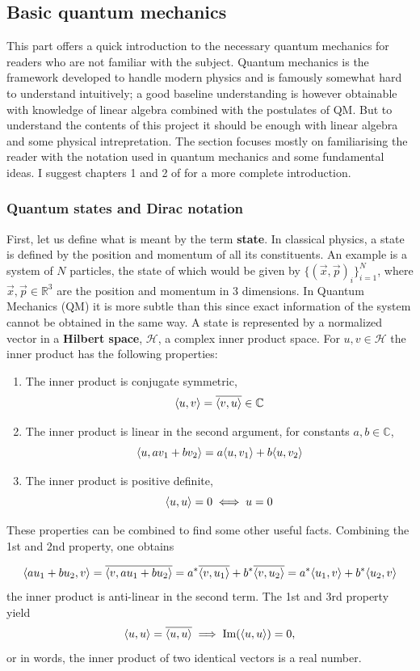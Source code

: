 
\subsection{Basic quantum mechanics}
This part offers a quick introduction to the necessary quantum mechanics for readers who are not familiar with the subject. Quantum mechanics is the framework developed to handle modern physics and is famously somewhat hard to understand intuitively; 
a good baseline understanding is however obtainable with knowledge of linear algebra combined with the postulates of QM. But to understand the contents of this project it should be enough with linear algebra and some physical intrepretation. The section focuses mostly on familiarising the reader with the notation used in quantum mechanics and some fundamental ideas. I suggest chapters 1  and 2 of \cite{Sakurai} for a more complete introduction.


\subsubsection{Quantum states and Dirac notation}
First, let us define what is meant by the term \textbf{state}. In classical physics, a state is defined by the position and momentum of all its constituents. An example is a system of $N$ particles, the state of which would be given by $\{ (\vec{x}, \vec{p})_i \}_{i=1}^N$, where $\vec{x},\vec{p} \in \mathbb{R}^3$ are the position and momentum in 3 dimensions. In Quantum Mechanics (QM) it is more subtle than this since exact information of the system cannot be obtained in the same way. A state is represented by a normalized vector in a \textbf{Hilbert space}, $\mathcal{H}$, a complex inner product space. For $u,v \in \mathcal{H}$ the inner product has the following properties:
\begin{enumerate}
\item  The inner product is conjugate symmetric, $$\langle u,v \rangle = \overline{\langle v,u \rangle} \in \mathbb{C}$$
\item The inner product is linear in the second argument, for constants $a,b\in \mathbb{C}$, $$\langle u,av_1 + bv_2 \rangle = a\langle u,v_1 \rangle + b\langle u,v_2 \rangle$$
\item The inner product is positive definite, $$\langle u,u \rangle = 0 \iff u = 0$$
\end{enumerate}
These properties can be combined to find some other useful facts. Combining the 1st and 2nd property, one obtains

\begin{equation}
\langle au_1 + bu_2,v \rangle = \overline{\langle v,au_1 + bu_2 \rangle} = a^{*}\overline{\langle v,u_1 \rangle} + b^{*}\overline{\langle v,u_2 \rangle} =   a^{*}\langle u_1,v \rangle + b^{*}\langle u_2,v \rangle
\end{equation} 
the inner product is anti-linear in the second term. The 1st and 3rd property yield
\begin{equation}
\langle u,u \rangle = \overline{\langle u,u \rangle} \implies \text{Im}(\langle u,u \rangle) = 0,
\end{equation}
or in words, the inner product of two identical vectors is a real number.

